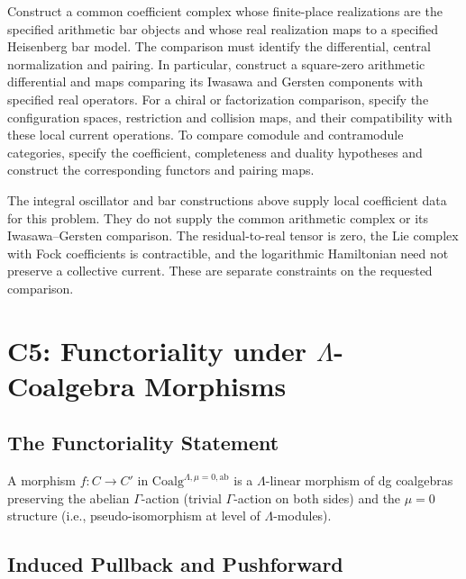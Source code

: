 \begin{question}
\label{v4-arith:pos-costello:thm:C4-closed}
Construct a common coefficient complex whose finite-place realizations
are the specified arithmetic bar objects and whose real realization
maps to a specified Heisenberg bar model. The comparison must identify
the differential, central normalization and pairing. In particular,
construct a square-zero arithmetic differential and maps comparing its
Iwasawa and Gersten components with specified real operators.
For a chiral or factorization comparison, specify the configuration
spaces, restriction and collision maps, and their compatibility with
these local current operations. To compare comodule and contramodule
categories, specify the coefficient, completeness and duality hypotheses
and construct the corresponding functors and pairing maps.
\end{question}

The integral oscillator and bar constructions above supply local
coefficient data for this problem. They do not supply the common
arithmetic complex or its Iwasawa--Gersten comparison. The
residual-to-real tensor is zero, the Lie complex with Fock coefficients
is contractible, and the logarithmic Hamiltonian need not preserve a
collective current. These are separate constraints on the requested
comparison.

\section{C5: Functoriality under \(\Lambda\)-Coalgebra Morphisms}
\label{v4-arith:pos-costello:C5}

\subsection{The Functoriality Statement}

\begin{definition}[morphisms of abelian \(\Lambda\)-coalgebras with \(\mu=0\)]
\label{v4-arith:pos-costello:def:morphism-Lambda-coalgebra}
A morphism \(f\colon C\to C'\) in
\(\mathrm{Coalg}^{\Lambda,\mu=0,\mathrm{ab}}\) is a
\(\Lambda\)-linear morphism of dg coalgebras preserving the
abelian \(\Gamma\)-action (trivial \(\Gamma\)-action on both sides)
and the \(\mu=0\) structure (i.e., pseudo-isomorphism at level of
\(\Lambda\)-modules).
\end{definition}

\subsection{Induced Pullback and Pushforward}

